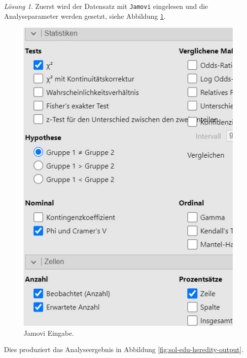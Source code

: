 \documentclass[
]{book}
\theoremstyle{definition}
\theoremstyle{definition}
\theoremstyle{definition}
\theoremstyle{definition}
\theoremstyle{remark}
\newtheorem*{solution}{Lösung}
\begin{document}
\begin{solution}

Zuerst wird der Datensatz mit \texttt{Jamovi} eingelesen und die
Analyseparameter werden gesetzt, siehe Abbildung
\ref{fig:sol-edu-heredity-input}.

\begin{figure}

{\centering \includegraphics{figures/10-exr-edu-heredity-jmv-input} 

}

\caption{Jamovi Eingabe.}\label{fig:sol-edu-heredity-input}
\end{figure}

Dies produziert das Analyseergebnis in Abbildung
\ref{fig:sol-edu-heredity-output}.

\begin{figure}


\end{figure}
\end{solution}
\end{document}
